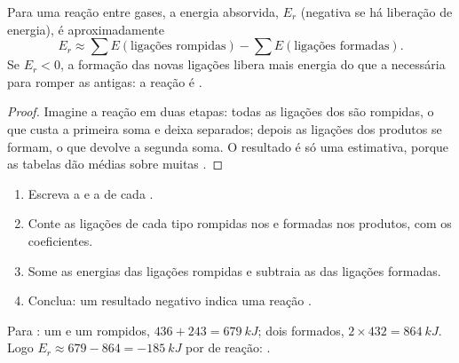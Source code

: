 \begin{proposition}\label{prop:g11:reaction-energy:estimate}
Para uma reação entre gases, a energia absorvida, $E_r$ (negativa se há
liberação de energia), é aproximadamente
\[
  E_r \approx \sum E(\text{ligações rompidas}) - \sum E(\text{ligações formadas}) .
\]
Se $E_r < 0$, a formação das novas ligações libera mais energia do que
a necessária para romper as antigas: a reação é .
\end{proposition}

\begin{proof}
Imagine a reação em duas etapas: todas as ligações dos  são
rompidas, o que custa a primeira soma e deixa  separados; depois
as ligações dos produtos se formam, o que devolve a segunda soma. O
resultado é só uma estimativa, porque as tabelas dão médias sobre muitas
.
\end{proof}

\begin{method}\label{met:g11:reaction-energy:bonds}
\begin{enumerate}
  \item Escreva a  e a  de cada
        .
  \item Conte as ligações de cada tipo rompidas nos  e formadas
        nos produtos, com os coeficientes.
  \item Some as energias das ligações rompidas e subtraia as das
        ligações formadas.
  \item Conclua: um resultado negativo indica uma reação .
\end{enumerate}
\end{method}

\begin{example}\label{ex:g11:reaction-energy:hcl}
Para : um  e um  rompidos,
$436 + 243 = \qty{679}{kJ}$; dois  formados, $2 \times 432 =
\qty{864}{kJ}$. Logo $E_r \approx 679 - 864 = \qty{-185}{kJ}$ por  de
reação: .
\end{example}



